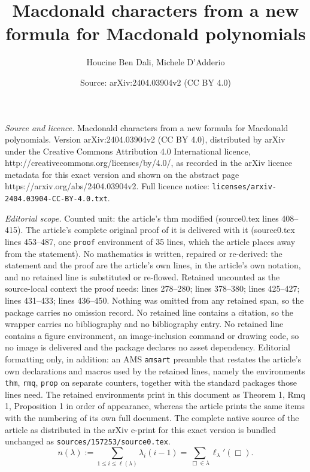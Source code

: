 \documentclass[10pt,a4paper]{amsart}
\title{Macdonald characters from a new formula for Macdonald polynomials}
\author{Houcine Ben Dali, Michele D'Adderio}
\date{Source: arXiv:2404.03904v2 (CC BY 4.0)}
\begin{document}
\maketitle

\noindent\emph{Source and licence.} Macdonald characters from a new formula for Macdonald polynomials. Version arXiv:2404.03904v2 (CC BY 4.0), distributed by arXiv under the Creative Commons Attribution 4.0 International licence, http://creativecommons.org/licenses/by/4.0/, as recorded in the arXiv licence metadata for this exact version and shown on the abstract page https://arxiv.org/abs/2404.03904v2. Full licence notice: \texttt{licenses/arxiv-2404.03904-CC-BY-4.0.txt}.\par\smallskip

\noindent\textit{Editorial scope.} Counted unit: the article's thm modified (source0.tex lines 408--415). The article's complete original proof of it is delivered with it (source0.tex lines 453--487, one \texttt{proof} environment of 35 lines, which the article places away from the statement). No mathematics is written, repaired or re-derived: the statement and the proof are the article's own lines, in the article's own notation, and no retained line is substituted or re-flowed.  Retained uncounted as the source-local context the proof needs: lines 278--280; lines 378--380; lines 425--427; lines 431--433; lines 436--450.  Nothing was omitted from any retained span, so the package carries no omission record.  No retained line contains a citation, so the wrapper carries no bibliography and no bibliography entry.  No retained line contains a figure environment, an image-inclusion command or drawing code, so no image is delivered and the package declares no asset dependency.  Editorial formatting only, in addition: an AMS \texttt{amsart} preamble that restates the article's own declarations and macros used by the retained lines, namely the environments \texttt{thm}, \texttt{rmq}, \texttt{prop} on separate counters, together with the standard packages those lines need.  The retained environments print in this document as Theorem 1, Rmq 1, Proposition 1 in order of appearance, whereas the article prints the same items with the numbering of its own full document.  The complete native source of the article as distributed in the arXiv e-print for this exact version is bundled unchanged as \texttt{sources/157253/source0.tex}.
\begin{equation}\label{eq n}
  n(\lambda):=\sum_{1\leq i\leq \ell(\lambda)}\lambda_{i}(i-1)=\sum_{\Box\in\lambda}\ell_\lambda'(\Box).  
\end{equation}
\end{document}
